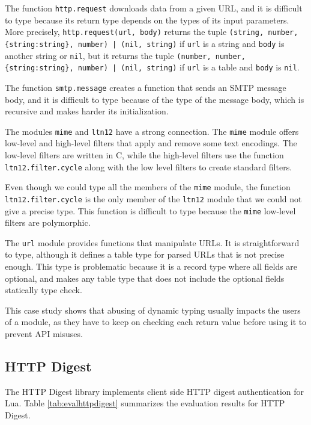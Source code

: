 The function \texttt{http.request} downloads data from a given URL,
and it is difficult to type because its return type depends on
the types of its input parameters.
More precisely, \texttt{http.request(url, body)} returns the tuple
\texttt{(string, number, \{string:string\}, number) | (nil, string)}
if \texttt{url} is a string and \texttt{body} is another string or \texttt{nil},
but it returns the tuple
\texttt{(number, number, \{string:string\}, number) | (nil, string)}
if \texttt{url} is a table and \texttt{body} is \texttt{nil}.

The function \texttt{smtp.message} creates a function that sends
an SMTP message body, and it is difficult to type because of the
type of the message body, which is recursive and makes harder
its initialization.

The modules \texttt{mime} and \texttt{ltn12} have a strong connection.
The \texttt{mime} module offers low-level and high-level filters
that apply and remove some text encodings.
The low-level filters are written in C, while the high-level filters
use the function \texttt{ltn12.filter.cycle} along with the low level
filters to create standard filters.

Even though we could type all the members of the \texttt{mime} module,
the function \texttt{ltn12.filter.cycle} is the only member of the
\texttt{ltn12} module that we could not give a precise type.
This function is difficult to type because the \texttt{mime} low-level
filters are polymorphic.

The \texttt{url} module provides functions that manipulate URLs.
It is straightforward to type, although it defines a table type for
parsed URLs that is not precise enough.
This type is problematic because it is a record type where all
fields are optional, and makes any table type that does not include
the optional fields statically type check.

This case study shows that abusing of dynamic typing usually impacts
the users of a module, as they have to keep on checking each return
value before using it to prevent API misuses.

\subsection{HTTP Digest}

The HTTP Digest library implements client side HTTP digest authentication for Lua.
Table \ref{tab:evalhttpdigest} summarizes the evaluation results for HTTP Digest.

